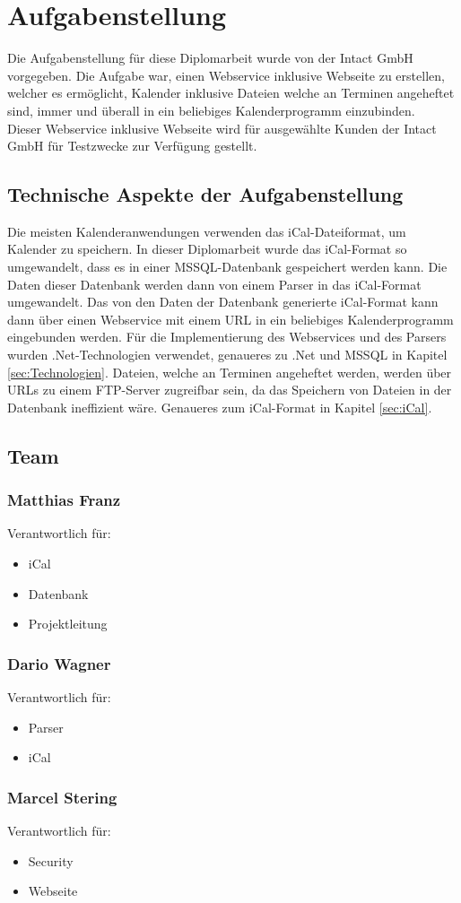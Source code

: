 \chapter{Aufgabenstellung}
\label{sec:Aufgabenstellung}
Die Aufgabenstellung für diese Diplomarbeit wurde von der Intact GmbH vorgegeben. Die Aufgabe war, einen Webservice inklusive Webseite zu erstellen, welcher es ermöglicht, Kalender inklusive Dateien welche an Terminen angeheftet sind, immer und überall in ein beliebiges Kalenderprogramm einzubinden. \\
Dieser Webservice inklusive Webseite wird für ausgewählte Kunden der Intact GmbH für Testzwecke zur Verfügung gestellt. \\

\section{Technische Aspekte der Aufgabenstellung}
\label{sec:TechnischeAspekteDerAufgabenstellung}
Die meisten Kalenderanwendungen verwenden das iCal-Dateiformat, um Kalender zu speichern. In dieser Diplomarbeit wurde das iCal-Format so umgewandelt, dass es in einer MSSQL-Datenbank gespeichert werden kann. Die Daten dieser Datenbank werden dann von einem Parser in das iCal-Format umgewandelt. Das von den Daten der Datenbank generierte iCal-Format kann dann über einen Webservice mit einem URL in ein beliebiges Kalenderprogramm eingebunden werden. Für die Implementierung des Webservices und des Parsers wurden .Net-Technologien verwendet, genaueres zu .Net und MSSQL in Kapitel \ref{sec:Technologien}.  Dateien, welche an Terminen angeheftet werden, werden über URLs zu einem FTP-Server zugreifbar sein, da das Speichern von Dateien in der Datenbank ineffizient wäre. Genaueres zum iCal-Format in Kapitel \ref{sec:iCal}.
\pagebreak

\section{Team}
\label{sec:Team}
	\subsection*{Matthias Franz}
		Verantwortlich für: 
		\begin{itemize}
			\item iCal
			\item Datenbank
			\item Projektleitung
		\end{itemize}
	\subsection*{Dario Wagner}
		Verantwortlich für: 
		\begin{itemize}
			\item Parser
			\item iCal
		\end{itemize}
	\subsection*{Marcel Stering}
		Verantwortlich für: 
		\begin{itemize}
			\item Security
			\item Webseite
		\end{itemize}	
\pagebreak			